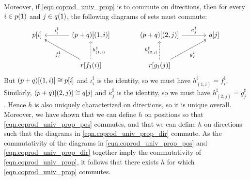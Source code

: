 \documentclass[Book-Poly]{subfiles}
\begin{document}
\begin{exercise}
\begin{solution}
Moreover, if \eqref{eqn.coprod_univ_prop} is to commute on directions, then for every $i\in p(\textsf{1})$ and $j \in q(\textsf{1})$, the following diagrams of sets must commute:
\begin{equation} \label{eqn.coprod_univ_prop_dir}
\begin{tikzcd}[sep=large]
	p[i] & (p+q)[(1,i)] \ar[l, "\iota^\sharp_i"'] & (p+q)[(2,j)] \ar[r, "\kappa^\sharp_j"] & q[j] \\
	& r[f_\1(i)] \ar[ul, "f^\sharp_i"] \ar[u, "h^\sharp_{(1,i)}"', dashed] & r[g_\1(j)] \ar[u, "h^\sharp_{(2,j)}", dashed] \ar[ur, "g^\sharp_j"']
\end{tikzcd}
\end{equation}
But $(p+q)[(1,i)] \cong p[i]$ and $\iota^\sharp_i$ is the identity, so we must have $h^\sharp_{(1,i)} = f^\sharp_i$.
Similarly, $(p+q)[(2,j)] \cong q[j]$ and $\kappa^\sharp_j$ is the identity, so we must have $h^\sharp_{(2,j)} = g^\sharp_j$.
Hence $h$ is also uniquely characterized on directions, so it is unique overall.
Moreover, we have shown that we can define $h$ on positions so that \eqref{eqn.coprod_univ_prop_pos} commutes, and that we can define $h$ on directions such that the diagrams in \eqref{eqn.coprod_univ_prop_dir} commute.
As the commutativity of the diagrams in \eqref{eqn.coprod_univ_prop_pos} and \eqref{eqn.coprod_univ_prop_dir} together imply the commutativity of \eqref{eqn.coprod_univ_prop}, it follows that there exists $h$ for which \eqref{eqn.coprod_univ_prop} commutes.
\end{solution}
\end{exercise}
\end{document}
